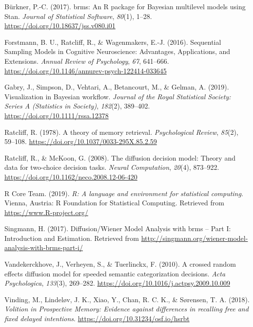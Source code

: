 \documentclass[
  11pt,
  english,
  ,doc,floatsintext]{apa6}
\begin{document}
\leavevmode\hypertarget{ref-R-brms_a}{}%
Bürkner, P.-C. (2017). brms: An R package for Bayesian multilevel models using Stan. \emph{Journal of Statistical Software}, \emph{80}(1), 1--28. \url{https://doi.org/10.18637/jss.v080.i01}

\leavevmode\hypertarget{ref-forstmann_sequential_2016}{}%
Forstmann, B. U., Ratcliff, R., \& Wagenmakers, E.-J. (2016). Sequential Sampling Models in Cognitive Neuroscience: Advantages, Applications, and Extensions. \emph{Annual Review of Psychology}, \emph{67}, 641--666. \url{https://doi.org/10.1146/annurev-psych-122414-033645}

\leavevmode\hypertarget{ref-gabry_visualization_2019}{}%
Gabry, J., Simpson, D., Vehtari, A., Betancourt, M., \& Gelman, A. (2019). Visualization in Bayesian workﬂow. \emph{Journal of the Royal Statistical Society: Series A (Statistics in Society)}, \emph{182}(2), 389--402. \url{https://doi.org/10.1111/rssa.12378}

\leavevmode\hypertarget{ref-ratcliff_theory_1978}{}%
Ratcliff, R. (1978). A theory of memory retrieval. \emph{Psychological Review}, \emph{85}(2), 59--108. \url{https://doi.org/10.1037/0033-295X.85.2.59}

\leavevmode\hypertarget{ref-ratcliff_diffusion_2008}{}%
Ratcliff, R., \& McKoon, G. (2008). The diffusion decision model: Theory and data for two-choice decision tasks. \emph{Neural Computation}, \emph{20}(4), 873--922. \url{https://doi.org/10.1162/neco.2008.12-06-420}

\leavevmode\hypertarget{ref-R-base}{}%
R Core Team. (2019). \emph{R: A language and environment for statistical computing}. Vienna, Austria: R Foundation for Statistical Computing. Retrieved from \url{https://www.R-project.org/}

\leavevmode\hypertarget{ref-singmann_diffusionux2fwiener_2017}{}%
Singmann, H. (2017). Diffusion/Wiener Model Analysis with brms -- Part I: Introduction and Estimation. Retrieved from \url{http://singmann.org/wiener-model-analysis-with-brms-part-i/}

\leavevmode\hypertarget{ref-vandekerckhove_crossed_2010}{}%
Vandekerckhove, J., Verheyen, S., \& Tuerlinckx, F. (2010). A crossed random effects diffusion model for speeded semantic categorization decisions. \emph{Acta Psychologica}, \emph{133}(3), 269--282. \url{https://doi.org/10.1016/j.actpsy.2009.10.009}

\leavevmode\hypertarget{ref-vinding_volition_2018}{}%
Vinding, M., Lindeløv, J. K., Xiao, Y., Chan, R. C. K., \& Sørensen, T. A. (2018). \emph{Volition in Prospective Memory: Evidence against differences in recalling free and fixed delayed intentions}. \url{https://doi.org/10.31234/osf.io/hsrbt}
\end{document}
